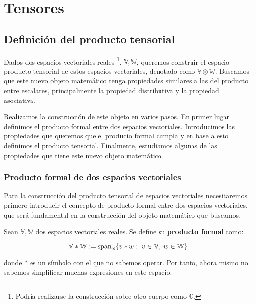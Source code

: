 \section{Tensores}

\subsection{Definición del producto tensorial} \label{sec:deftensor}

Dados dos espacios vectoriales reales \footnote{Podría realizarse la construcción sobre otro cuerpo como $\mathbb{C}$.}. $\mathbb{V}, \mathbb{W}$, queremos construir el espacio producto tensorial de estos espacios vectoriales, denotado como $\mathbb{V} \otimes \mathbb{W}$. Buscamos que este nuevo objeto matemático tenga propiedades similares a las del producto entre escalares, principalmente la propiedad distributiva y la propiedad asociativa.

Realizamos la construcción de este objeto en varios pasos. En primer lugar definimos el producto formal entre dos espacios vectoriales. Introducimos las propiedades que queremos que el producto formal cumpla y en base a esto definimos el producto tensorial. Finalmente, estudiamos algunas de las propiedades que tiene este nuevo objeto matemático.

\subsubsection{Producto formal de dos espacios vectoriales}

Para la construcción del producto tensorial de espacios vectoriales necesitaremos primero introducir el concepto de producto formal entre dos espacios vectoriales, que será fundamental en la construcción del objeto matemático que buscamos.

\begin{definicion}
	Sean $\mathbb{V}, \mathbb{W}$ dos espacios vectoriales reales. Se define su \textbf{producto formal} como:

	\begin{equation}
		\mathbb{V} \ast \mathbb{W} := \text{span}_{\mathbb{R}} \{ v \ast w : \; v \in \mathbb{V}, \; w \in \mathbb{W} \}
	\end{equation}

	donde $*$ es un símbolo con el que no sabemos operar. Por tanto, ahora mismo no sabemos simplificar muchas expresiones en este espacio.
\end{definicion}

